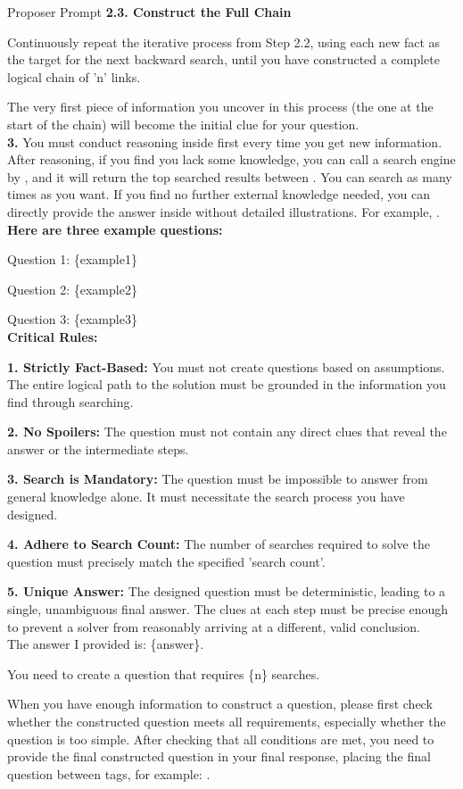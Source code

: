 \begin{examplebox}{Proposer Prompt}
    \quad \textbf{2.3. Construct the Full Chain}

    \qquad Continuously repeat the iterative process from Step 2.2, using each new fact as the target for the next backward search, until you have constructed a complete logical chain of 'n' links.

    \qquad The very first piece of information you uncover in this process (the one at the start of the chain) will become the initial clue for your question.\\
    
    \textbf{3.} You must conduct reasoning inside  first every time you get new information. After reasoning, if you find you lack some knowledge, you can call a search engine by , and it will return the top searched results between . You can search as many times as you want. If you find no further external knowledge needed, you can directly provide the answer inside  without detailed illustrations. For example, .\\

    \textbf{Here are three example questions:}

    Question 1: \{example1\}
    
    Question 2: \{example2\}
    
    Question 3: \{example3\}\\

    \textbf{Critical Rules:}

    \textbf{1. Strictly Fact-Based:} You must not create questions based on assumptions. The entire logical path to the solution must be grounded in the information you find through searching.

    \textbf{2. No Spoilers:} The question must not contain any direct clues that reveal the answer or the intermediate steps.

    \textbf{3. Search is Mandatory:} The question must be impossible to answer from general knowledge alone. It must necessitate the search process you have designed.

    \textbf{4. Adhere to Search Count:} The number of searches required to solve the question must precisely match the specified 'search count'.

    \textbf{5. Unique Answer:} The designed question must be deterministic, leading to a single, unambiguous final answer. The clues at each step must be precise enough to prevent a solver from reasonably arriving at a different, valid conclusion.\\

The answer I provided is: \{answer\}. 

You need to create a question that requires \{n\} searches.

When you have enough information to construct a question, please first check whether the constructed question meets all requirements, especially whether the question is too simple. After checking that all conditions are met, you need to provide the final constructed question in your final response, placing the final question between  tags, for example: .
\end{examplebox}

